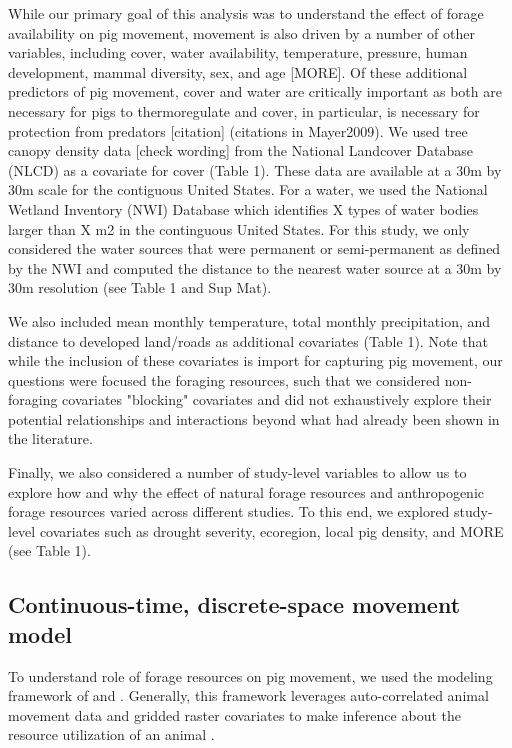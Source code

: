 \documentclass[a4paper]{article}
\begin{document}
While our primary goal of this analysis was to understand the effect of forage availability on pig movement, movement is also driven by a number of other variables, including cover, water availability, temperature, pressure, human development, mammal diversity, sex, and age \citep{McClure2015,Garza2017,Kay2017} [MORE].  Of these additional predictors of pig movement, cover and water are critically important as both are necessary for pigs to thermoregulate \citep{Choquenot1996a} and cover, in particular, is necessary for protection from predators [citation] (citations in Mayer2009). We used tree canopy density data [check wording] from the National Landcover Database (NLCD) as a covariate for cover (Table 1). These data are available at a 30m by 30m scale for the contiguous United States. For a water, we used the National Wetland Inventory (NWI) Database which identifies X types of water bodies larger than X m2 in the continguous United States. For this study, we only considered the water sources that were permanent or semi-permanent as defined by the NWI and computed the distance to the nearest water source at a 30m by 30m resolution (see Table 1 and Sup Mat). 

We also included mean monthly temperature, total monthly precipitation, and distance to developed land/roads as additional covariates (Table 1). Note that while the inclusion of these covariates is import for capturing pig movement, our questions were focused the foraging resources, such that we considered non-foraging covariates "blocking" covariates and did not exhaustively explore their potential relationships and interactions beyond what had already been shown in the literature.  

Finally, we also considered a number of study-level variables to allow us to explore how and why the effect of natural forage resources and anthropogenic forage resources varied across different studies. To this end, we explored study-level covariates such as drought severity, ecoregion, local pig density, and MORE (see Table 1). 

\subsection*{Continuous-time, discrete-space movement model}

To understand role of forage resources on pig movement, we used the modeling framework of \cite{Hanks2015} and \cite{Wilson2018}.  Generally, this framework leverages auto-correlated animal movement data and gridded raster covariates to make inference about the resource utilization of an animal \citep{Hanks2015,Buderman2018,Wilson2018}.  
\end{document}
